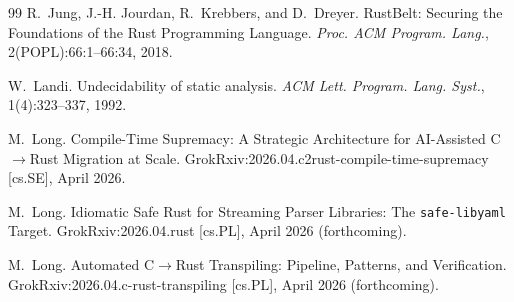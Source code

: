 \documentclass[12pt]{article}
\newcommand{\safelibyaml}{\texttt{safe-libyaml}}
\theoremstyle{definition}
\theoremstyle{remark}
\begin{document}
\begin{thebibliography}{99}
 R.~Jung, J.-H. Jourdan, R.~Krebbers, and D.~Dreyer. RustBelt: Securing the Foundations of the Rust Programming Language. \emph{Proc. ACM Program. Lang.}, 2(POPL):66:1--66:34, 2018.

 W.~Landi. Undecidability of static analysis. \emph{ACM Lett. Program. Lang. Syst.}, 1(4):323--337, 1992.

 M.~Long. Compile-Time Supremacy: A Strategic Architecture for AI-Assisted C$\to$Rust Migration at Scale. GrokRxiv:2026.04.c2rust-compile-time-supremacy [cs.SE], April 2026.

 M.~Long. Idiomatic Safe Rust for Streaming Parser Libraries: The \safelibyaml{} Target. GrokRxiv:2026.04.rust [cs.PL], April 2026 (forthcoming).

 M.~Long. Automated C$\to$Rust Transpiling: Pipeline, Patterns, and Verification. GrokRxiv:2026.04.c-rust-transpiling [cs.PL], April 2026 (forthcoming).

\end{thebibliography}
\end{document}
